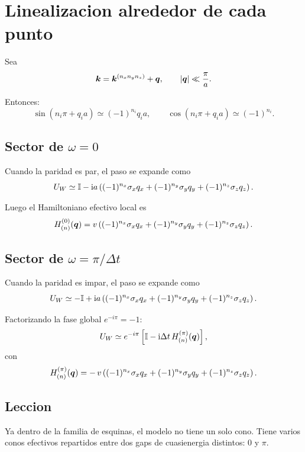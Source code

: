 \section{Linealizacion alrededor de cada punto}
Sea
\begin{equation}
\bm{k} = \bm{k}^{(n_x n_y n_z)}+\bm{q},
\qquad
\abs{\bm{q}}\ll \frac{\pi}{a}.
\end{equation}

Entonces:
\begin{equation}
\sin(n_i\pi + q_i a)\simeq (-1)^{n_i}q_i a,
\qquad
\cos(n_i\pi + q_i a)\simeq (-1)^{n_i}.
\end{equation}

\subsection{Sector de \(\omega=0\)}
Cuando la paridad es par, el paso se expande como
\begin{equation}
U_W \simeq
\mathbb{I}
-\mathrm{i} a\left(
(-1)^{n_x}\sigma_x q_x
+(-1)^{n_y}\sigma_y q_y
+(-1)^{n_z}\sigma_z q_z
\right).
\end{equation}

Luego el Hamiltoniano efectivo local es
\begin{equation}
H^{(0)}_{(n)}(\bm{q})
=
v\left(
(-1)^{n_x}\sigma_x q_x
+(-1)^{n_y}\sigma_y q_y
+(-1)^{n_z}\sigma_z q_z
\right).
\label{c32:eq:H0}
\end{equation}

\subsection{Sector de \(\omega=\pi/\Delta t\)}
Cuando la paridad es impar, el paso se expande como
\begin{equation}
U_W \simeq
-\mathbb{I}
+\mathrm{i} a\left(
(-1)^{n_x}\sigma_x q_x
+(-1)^{n_y}\sigma_y q_y
+(-1)^{n_z}\sigma_z q_z
\right).
\end{equation}

Factorizando la fase global \(e^{-i\pi}=-1\):
\begin{equation}
U_W \simeq
e^{-i\pi}
\left[
\mathbb{I}
-\mathrm{i} \Delta t\,H^{(\pi)}_{(n)}(\bm{q})
\right],
\end{equation}
con
\begin{equation}
H^{(\pi)}_{(n)}(\bm{q})
=
-\,v\left(
(-1)^{n_x}\sigma_x q_x
+(-1)^{n_y}\sigma_y q_y
+(-1)^{n_z}\sigma_z q_z
\right).
\label{c32:eq:Hpi}
\end{equation}

\subsection{Leccion}
Ya dentro de la familia de esquinas, el modelo no tiene un solo cono. Tiene varios conos efectivos repartidos entre dos gaps de cuasienergia distintos: \(0\) y \(\pi\).


